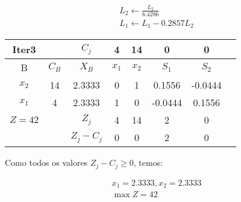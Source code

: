 \documentclass[]{article}
\begin{document}
\begin{align*}
    L_2 \leftarrow \frac{L_2}{6.4286} \\
    L_1 \leftarrow L_1 - 0.2857L_2
\end{align*}

\begin{center}
 \begin{tabular}{| c | c | c | c | c | c | c | c |} 
 \hline
 Iter3 &   & $C_j$ & 4 & 14 & 0 & 0 &  \\ [0.5ex] 
 \hline
 B & $C_B$ & $X_B$ & $x_1$ & $x_2$ & $S_1$ & $S_2$ &  \\ 
 \hline
 $x_2$ & 14 & 2.3333 & 0 & 1 & 0.1556 & -0.0444 &  \\
 \hline
 $x_1$ & 4 & 2.3333 & 1 & 0 & -0.0444 & 0.1556 &  \\
 \hline
 $Z=42$ &   & $Z_j$ & 4 & 14 & 2 & 0 &   \\
 \hline
  &   & $Z_j - C_j$ & 0 & 0 & 2 & 0 &  \\
 \hline
\end{tabular}
\end{center}

Como todos os valores $Z_j - C_j \geq 0$, temos:

\begin{align*}
    x_1=2.3333, x_2=2.3333 \\
    \max Z = 42
\end{align*}
\end{document}
